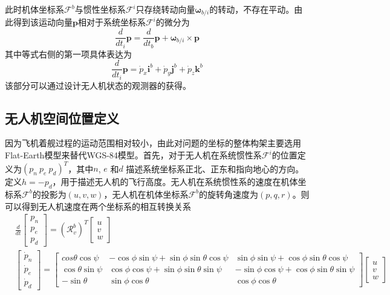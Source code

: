 此时机体坐标系$\mathcal{F}^b$与惯性坐标系$\mathcal{F}^i$只存绕转动向量$\mathbf{\omega}_{b/i}$的转动，不存在平动。由此得到该运动向量$\mathbf{p}$相对于系统坐标系$\mathcal{F}^i$的微分为
\begin{equation} \label{chp02_vector_derivative}
\frac{d}{dt_i} \mathbf{p} = \frac{d}{dt_b} \mathbf{p} + \mathbf{\omega}_{b/i} \times \mathbf{p}
\end{equation}
其中等式右侧的第一项具体表达为
\begin{equation}
\frac{d}{dt_i} \mathbf{p} = \dot{p}_x \mathbf{i}^b +  \dot{p}_y \mathbf{j}^b +  \dot{p}_z \mathbf{k}^b
\end{equation}
该部分可以通过设计无人机状态的观测器的获得。

\subsection{无人机空间位置定义}
因为飞机着舰过程的运动范围相对较小，由此对问题的坐标的整体构架主要选用Flat-Earth模型来替代WGS-84模型。首先，对于无人机在系统惯性系$\mathcal{F}^i$的位置定义为$(p_n\ p_e\ p_d)^T$，其中$n$, $e$  和$d$ 描述系统坐标系正北、正东和指向地心的方向。定义$h = -p_d$，用于描述无人机的飞行高度。无人机在系统惯性系的速度在机体坐标系$\mathcal{F}^b$的投影为$(u, v, w)$，无人机在机体坐标系$\mathcal{F}^b$的旋转角速度为$(p, q, r)$。则可以得到无人机速度在两个坐标系的相互转换关系
\begin{align}
&\frac{d}{dt} \begin{bmatrix} p_n \\ p_e \\ p_d \end{bmatrix}   =  (\mathcal{R}_v^b)^T \begin{bmatrix} u \\  v \\ w \end{bmatrix}  \\
&\begin{bmatrix} \dot{p}_n \\ \dot{p}_e \\ \dot{p}_d \end{bmatrix} = \begin{bmatrix}  cos \theta \cos \psi   &     -\cos\phi \sin\psi + \sin\phi \sin\theta \cos\psi                        &  \sin\phi \sin\psi + \cos\phi \sin\theta \cos\psi       \\
\cos\theta \sin\psi    & \cos\phi \cos\psi + \sin\phi \sin\theta\sin\psi   & -\sin\phi \cos\psi + \cos\phi \sin\theta \sin\psi \\
-\sin\theta  & \sin\phi \cos\theta & \cos\phi \cos\theta
\end{bmatrix} \begin{bmatrix} u \\  v \\ w \end{bmatrix}
\end{align}
